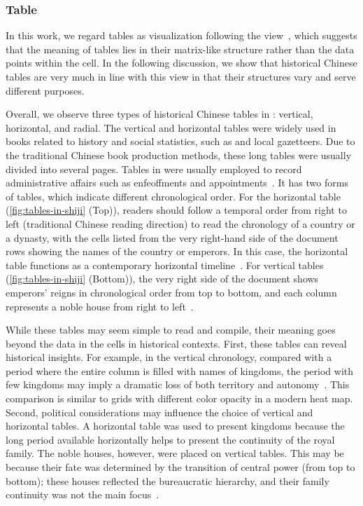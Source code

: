 \subsubsection{Table}

In this work, we regard tables as visualization following the view~\cite{Riggsby2019Mosaics}, which suggests that the meaning of tables lies in their matrix-like structure rather than the data points within the cell.
In the following discussion, we show that historical Chinese tables are very much in line with this view in that their structures vary and serve different purposes.

Overall, we observe three types of historical Chinese tables in \datasetName: vertical, horizontal, and radial.
The vertical and horizontal tables were widely used in books related to history and social statistics, such as  and local gazetteers.
Due to the traditional Chinese book production methods, these long tables were usually divided into several pages.
Tables in \term{\Shiji} were usually employed to record administrative affairs such as enfeoffments and appointments~\cite{Vankeerberghen2007Tables}.
It has two forms of tables, which indicate different chronological order.
For the horizontal table (\cref{fig:tables-in-shiji} (Top)), readers should follow a temporal order from right to left (traditional Chinese reading direction) to read the chronology of a country or a dynasty, with the cells listed from the very right-hand side of the document rows showing the names of the country or emperors.
In this case, the horizontal table functions as a contemporary horizontal timeline~\cite{Rosenberg2010Cartographies}.
For vertical tables (\cref{fig:tables-in-shiji} (Bottom)), the very right side of the document shows emperors' reigns in chronological order from top to bottom, and each column represents a noble house from right to left~\cite{Vankeerberghen2007Tables}.

While these tables may seem simple to read and compile, their meaning goes beyond the data in the cells in historical contexts.
First, these tables can reveal historical insights. 
For example, in the vertical chronology, compared with a period where the entire column is filled with names of kingdoms, the period with few kingdoms may imply a dramatic loss of both territory and autonomy~\cite{Vankeerberghen2007Tables}.
This comparison is similar to grids with different color opacity in a modern heat map.
Second, political considerations may influence the choice of vertical and horizontal tables.
A horizontal table was used to present kingdoms because the long period available horizontally helps to present the continuity of the royal family\cite{Vankeerberghen2007Tables}.
The noble houses, however, were placed on vertical tables.
This may be because their fate was determined by the transition of central power (from top to bottom); these houses reflected the bureaucratic hierarchy, and their family continuity was not the main focus~\cite{Vankeerberghen2007Tables}.

